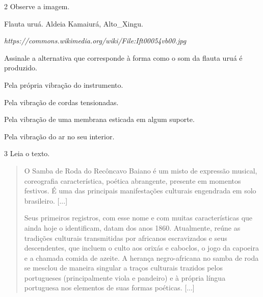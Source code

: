 \num{2} Observe a imagem.


Flauta uruá. Aldeia Kamaiurá, Alto\_Xingu.

\emph{https://commons.wikimedia.org/wiki/File:Ift00054vb00.jpg}

Assinale a alternativa que corresponde à forma como o som da flauta uruá é produzido.

\begin{escolha}
\item
  Pela própria vibração do instrumento.
\item
  Pela vibração de cordas tensionadas.
\item
  Pela vibração de uma membrana esticada em algum suporte.
\item
  Pela vibração do ar no seu interior.
\end{escolha}


\num{3}  Leia o texto.

\begin{quote}
O Samba de Roda do Recôncavo Baiano é um misto de expressão musical,
coreografia característica, poética abrangente, presente em momentos
festivos. É uma das principais manifestações culturais engendrada em
solo brasileiro. {[}...{]}

Seus primeiros registros, com esse nome e com muitas características que
ainda hoje o identificam, datam dos anos 1860. Atualmente, reúne as
tradições culturais transmitidas por africanos escravizados e seus
descendentes, que incluem o culto aos orixás e caboclos, o jogo da
capoeira e a chamada comida de azeite. A herança negro-africana no samba
de roda se mesclou de maneira singular a traços culturais trazidos pelos
portugueses (principalmente viola e pandeiro) e à própria língua
portuguesa nos elementos de suas formas poéticas. {[}...{]}

\end{quote}

